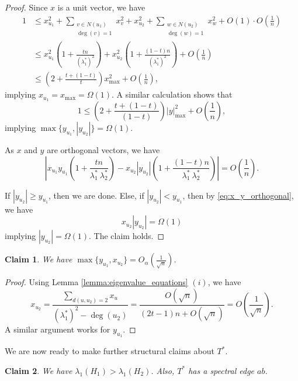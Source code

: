 \documentclass[11pt]{article}
\theoremstyle{plain}
\newtheorem{claim}{Claim}[section]
\numberwithin{equation}{section}
\begin{document}
\begin{proof} Since $x$ is a unit vector, we have
\begin{align*} 
1 & \le    x_{u_1}^2 + \sum_{\substack{v\in N(u_1)\\ \deg(v) =1}} x_v^2 + x_{u_2}^2 + \sum_{\substack{w\in N(u_2)\\ \deg(w) =1}} x_w^2 + O(1)\cdot O\left(\frac{1}{n}\right) \\
& \le x_{u_1}^2\left(1 + \frac{tn}{(\lambda_1^*)^2}\right) + x_{u_2}^2\left(1 + \frac{(1-t)n}{(\lambda_1^*)^2}\right) + O\left(\frac{1}{n}\right)\\
& \le \left(2 + \frac{t + (1-t)}{t}\right)x_{\max}^2 +  O\left(\frac{1}{n}\right),
\end{align*}
implying $x_{u_1}=x_{\max} = \Omega(1)$. A similar calculation shows that 
\[ 1 \le \left(2 + \frac{t + (1-t)}{(1-t)} \right)|y|_{\max}^2 + O\left(\frac{1}{n}\right),\]
implying $\max\{y_{u_1}, |y_{u_2}|\} = \Omega(1)$.

As $x$ and $y$ are orthogonal vectors, we have 
\begin{equation}\label{eq:x_y_orthogonal}
 \left|x_{u_1}y_{u_1}\left(1 + \frac{tn}{\lambda_1^*\ \lambda_2^*}\right) - x_{u_2}|y_{u_2}|\left(1 + \frac{(1-t)n}{\lambda_1^*\ \lambda_2^*}\right)\right| = O\left(\frac{1}{n}\right).    
\end{equation}

If $|y_{u_2}|\ge y_{u_1}$, then we are done. Else, if $|y_{u_2}| < y_{u_1}$, then by \eqref{eq:x_y_orthogonal}, we have 
\[ x_{u_2}|y_{u_2}| = \Omega(1)\]
implying $|y_{u_2}| = \Omega(1)$. The claim holds.
\end{proof}

\begin{claim}\label{claim:yu1_xu2_small_entry}
    We have $\max\{y_{u_1}, x_{u_2}\} = O_\alpha\left(\frac{1}{\sqrt{n}}\right)$.
\end{claim}

\begin{proof} Using Lemma \ref{lemma:eigenvalue_equations} $(i)$, we have 
\[ x_{u_2} = \frac{\sum_{d(u,u_2)=2} x_u}{(\lambda_1^*)^2 - \deg(u_2)} = \frac{O(\sqrt{n})}{(2t-1)n + O(\sqrt{n})} = O\left(\frac{1}{\sqrt{n}}\right).\]
A similar argument works for $y_{u_1}$. 
\end{proof}

We are now ready to make further structural claims about $T^*$. 

\begin{claim}\label{claim:large_H_1} We have $\lambda_1(H_1)>\lambda_1(H_2)$. Also, $T^*$ has a spectral edge $ab$.
\end{claim}
\end{document}

